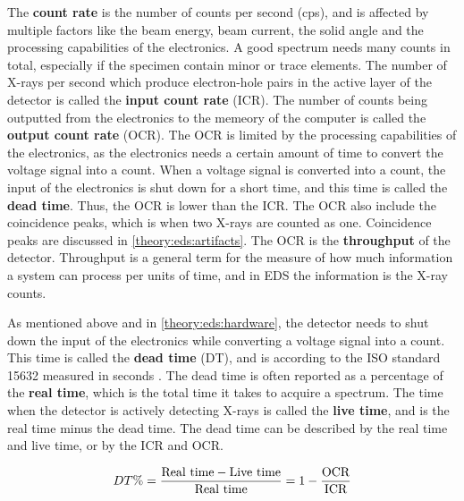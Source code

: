 The \textbf{count rate} is the number of counts per second (cps), and is affected by multiple factors like the beam energy, beam current, the solid angle and the processing capabilities of the electronics.
A good spectrum needs many counts in total, especially if the specimen contain minor or trace elements.
The number of X-rays per second which produce electron-hole pairs in the active layer of the detector is called the \textbf{input count rate} (ICR).
The number of counts being outputted from the electronics to the memeory of the computer is called the \textbf{output count rate} (OCR).
The OCR is limited by the processing capabilities of the electronics, as the electronics needs a certain amount of time to convert the voltage signal into a count.
When a voltage signal is converted into a count, the input of the electronics is shut down for a short time, and this time is called the \textbf{dead time}.
Thus, the OCR is lower than the ICR.
The OCR also include the coincidence peaks, which is when two X-rays are counted as one.
Coincidence peaks are discussed in \cref{theory:eds:artifacts}.
The OCR is the \textbf{throughput} of the detector.
Throughput is a general term for the measure of how much information a system can process per units of time, and in EDS the information is the X-ray counts.



As mentioned above and in \cref{theory:eds:hardware}, the detector needs to shut down the input of the electronics while converting a voltage signal into a count.
This time is called the \textbf{dead time} (DT), and is according to the ISO standard 15632 measured in seconds \cite{iso_qc_15632}.
The dead time is often reported as a percentage of the \textbf{real time}, which is the total time it takes to acquire a spectrum.
The time when the detector is actively detecting X-rays is called the \textbf{live time}, and is the real time minus the dead time.
The dead time can be described by the real time and live time, or by the ICR and OCR.

\begin{equation}
    \label{eq:dead_time}
    DT \% = \frac{\textnormal{Real time} - \textnormal{Live time}}{\textnormal{Real time}} = 1 - \frac{\textnormal{OCR}}{\textnormal{ICR}}
\end{equation}


